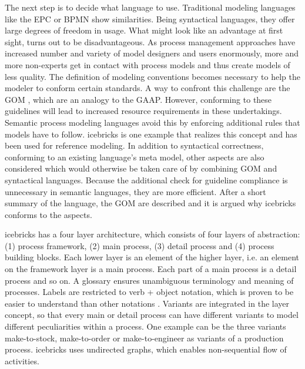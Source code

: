 	 The next step is to decide what language to use. Traditional modeling languages like the \acrfull{EPC} or \acrfull{BPMN} show similarities. Being syntactical languages, they offer large degrees of freedom in usage. What might look like an advantage at first sight, turns out to be disadvantageous. As process management approaches have increased number and variety of model designers and users enormously, more and more non-experts get in contact with process models and thus create models of less quality.  The definition of modeling conventions becomes necessary to help the modeler to conform certain standards. A way to confront this challenge are the \acrfull{GOM} \citep{BeckerGOM2012}, which are an analogy to the \acrfull{GAAP}. However, conforming to these guidelines will lead to increased resource requirements in these undertakings. Semantic process modeling languages avoid this by enforcing additional rules that models have to follow. icebricks \citep{becker2015icebricks} is one example that realizes this concept and has been used for reference modeling. In addition to syntactical correctness, \ie conforming to an existing language's meta model, other aspects are also considered which would otherwise be taken care of by combining \acrshort{GOM} and syntactical languages. Because the additional check for guideline compliance is unnecessary in semantic languages, they are more efficient. After a short summary of the language,  the \acrshort{GOM} are described and it is argued why icebricks conforms to the aspects. 
	 
	 icebricks has a four layer architecture, which consists of four layers of abstraction: (1) process framework, (2) main process, (3) detail process and (4) process building blocks. Each lower layer is an element of the higher layer, i.e. an element on the framework layer is a main process. Each part of a main process is a detail process and so on. A glossary ensures unambiguous terminology and meaning of processes. Labels are restricted to verb + object notation, which is proven to be easier to understand than other notations \citep{Mendling_2010}. Variants are integrated in the layer concept, so that every main or detail process can have different variants to model different peculiarities within a process. One example can be the three variants make-to-stock, make-to-order or make-to-engineer as variants of a production process. icebricks uses undirected graphs, which enables non-sequential flow of activities. 
	 
	 
